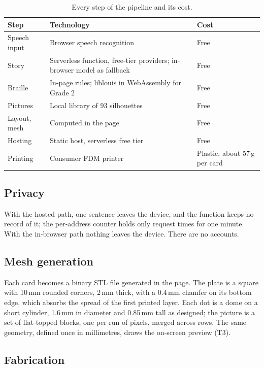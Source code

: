 \documentclass[conference]{IEEEtran}
\begin{document}
\begin{table}[t]
\caption{Every step of the pipeline and its cost.}
\label{tab:cost}
\centering
\begin{tabular}{p{2.2cm}p{3.9cm}p{0.8cm}}
\toprule
Step & Technology & Cost \\
\midrule
Speech input & Browser speech recognition & Free \\
Story & Serverless function, free-tier providers; in-browser model as fallback & Free \\
Braille & In-page rules; liblouis in WebAssembly for Grade 2 & Free \\
Pictures & Local library of 93 silhouettes & Free \\
Layout, mesh & Computed in the page & Free \\
Hosting & Static host, serverless free tier & Free \\
Printing & Consumer FDM printer & Plastic, about 57\,g per card \\
\bottomrule
\end{tabular}
\end{table}

\subsection{Privacy}

With the hosted path, one sentence leaves the device, and the function keeps no record of it; the per-address counter holds only request times for one minute. With the in-browser path nothing leaves the device. There are no accounts.

\subsection{Mesh generation}

Each card becomes a binary STL file generated in the page. The plate is a square with 10\,mm rounded corners, 2\,mm thick, with a 0.4\,mm chamfer on its bottom edge, which absorbs the spread of the first printed layer. Each dot is a dome on a short cylinder, 1.6\,mm in diameter and 0.85\,mm tall as designed; the picture is a set of flat-topped blocks, one per run of pixels, merged across rows. The same geometry, defined once in millimetres, draws the on-screen preview (T3).

\subsection{Fabrication}\label{sec:fab}
\end{document}
